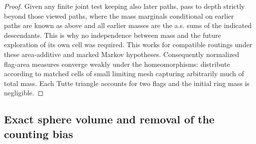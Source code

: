 \begin{proof}
Given any finite joint test keeping also later paths, pass to depth strictly beyond those viewed paths, where the mass marginals conditional on earlier paths are known as above and all earlier masses are the a.s. sums of the indicated descendants.
This is why no independence between mass and the future exploration of its own cell was required.
This works for compatible routings under these area-additive and marked Markov hypotheses.
Consequently normalized flag-area measures converge weakly under the homeomorphisms: distribute according to matched cells of small limiting mesh capturing arbitrarily much of total mass.
Each Tutte triangle accounts for two flags and the initial ring mass is negligible.

\end{proof}

\subsection{Exact sphere volume and removal of the counting bias}\label{cut:conditioning-section}

